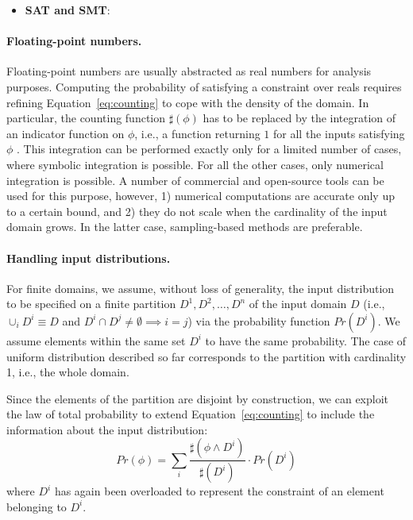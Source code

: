 \begin{itemize}
	\item \textbf{SAT and SMT}: 

\end{itemize}


\paragraph{Floating-point numbers.} 
Floating-point numbers are usually abstracted as real numbers for analysis purposes. Computing the probability of satisfying a constraint over reals requires refining Equation~\ref{eq:counting} to cope with the density of the domain. In particular, the counting function $\sharp(\phi)$ has to be replaced by the integration of an indicator function on $\phi$, i.e., a function returning $1$ for all the inputs satisfying $\phi$ \cite{Borges2014}. This integration can be performed exactly only for a limited number of cases, where symbolic integration is possible. For all the other cases, only numerical integration is possible. A number of commercial and open-source tools can be used for this purpose, however, 1) numerical computations are accurate only up to a certain bound, and 2) they do not scale when the cardinality of the input domain grows. In the latter case, sampling-based methods are preferable. 

\paragraph{Handling input distributions.} 
For finite domains, we assume, without loss of generality, the input distribution to be specified on a finite partition $D^1, D^2, \dots, D^n$ of the input domain $D$ (i.e., $\cup_i D^i \equiv D$ and $D^i \cap D^j \neq \emptyset \implies i=j$) via the probability function $Pr(D^i)$. We assume elements within the same set $D^i$ to have the same probability. The case of uniform distribution described so far corresponds to the partition with cardinality 1, i.e., the whole domain.
 
Since the elements of the partition are disjoint by construction, we can exploit the law of total probability to extend Equation~\eqref{eq:counting} to include the information about the input distribution:
%
\begin{equation}\label{eq:countingInputDistribution}
	Pr(\phi) = \sum_i \frac{\sharp(\phi \land D^i)}{\sharp(D^i)} \cdot Pr(D^i)
\end{equation}
%
\noindent where $D^i$ has again been overloaded to represent the constraint of an element belonging to $D^i$.

